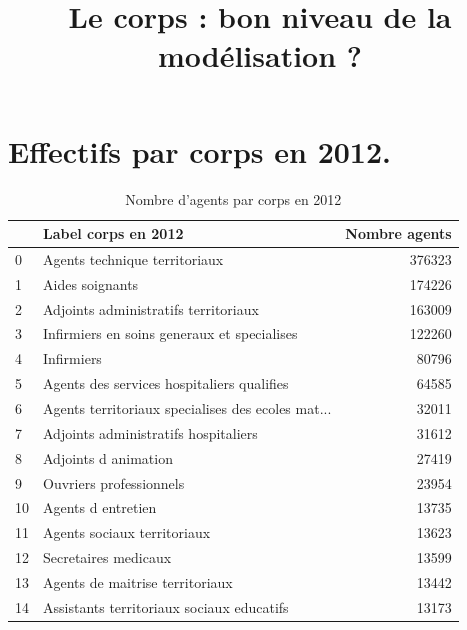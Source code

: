 \documentclass[11pt,a4paper]{article}
\begin{document}
\title{Le corps : bon niveau de la modélisation ?}


\author{}


\maketitle

\section{Effectifs par corps en 2012.}

\begin{table}[h!]
	\label{means}
	\centering
	\caption{Nombre d'agents par corps en 2012} 
\begin{tabular}{llr}
	\toprule
	{} &                                Label corps en 2012 &  Nombre agents \\
	\midrule
	0  &                      Agents technique territoriaux &         376323 \\
	1  &                                    Aides soignants &         174226 \\
	2  &               Adjoints administratifs territoriaux &         163009 \\
	3  &        Infirmiers en soins generaux et specialises &         122260 \\
	4  &                                         Infirmiers &          80796 \\
	5  &         Agents des services hospitaliers qualifies &          64585 \\
	6  &  Agents territoriaux specialises des ecoles mat... &          32011 \\
	7  &               Adjoints administratifs hospitaliers &          31612 \\
	8  &                               Adjoints d animation &          27419 \\
	9  &                            Ouvriers professionnels &          23954 \\
	10 &                                 Agents d entretien &          13735 \\
	11 &                        Agents sociaux territoriaux &          13623 \\
	12 &                               Secretaires medicaux &          13599 \\
	13 &                    Agents de maitrise territoriaux &          13442 \\
	14 &          Assistants territoriaux sociaux educatifs &          13173 \\

\end{tabular}
\end{table}
\end{document}
